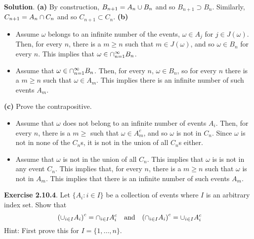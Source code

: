 \textbf{Solution}.
\textbf{(a)} By construction, \(B_{n+1} = A_{n} \cup B_{n}\) and so
\(B_{n + 1} \supset B_{n}\). Similarly, \(C_{n+1} = A_{n} \cap C_{n}\) and so
\(C_{n + 1} \subset C_{n}\).
\textbf{(b)}
\begin{itemize}
\item
  Assume \(\omega\) belongs to an infinite number of the events,
  \(\omega \in A_{j}\) for \(j \in J(\omega)\). Then, for every \(n\),
  there is a \(m \geq n\) such that \(m \in J(\omega)\), and so
  \(\omega \in B_{n}\) for every \(n\). This implies that
  \(\omega \in \cap_{n = 1}^{\infty} B_{n}\).
\item
  Assume that \(\omega \in \cap_{n = 1}^{\infty} B_{n}\). Then, for every
  \(n\), \(\omega \in B_{n}\), so for every \(n\) there is a \(m \geq n\)
  such that \(\omega \in A_m\). This implies there is an infinite number
  of such events \(A_m\).
\end{itemize}
\textbf{(c)}
Prove the contrapositive.
\begin{itemize}[tightlist]
\item
  Assume that \(\omega\) does not belong to an infinite number of events
  \(A_{i}\). Then, for every \(n\), there is a \(m \geq\) such that
  \(\omega \in A_m^{c}\), and so \(\omega\) is not in \(C_{n}\). Since
  \(\omega\) is not in none of the \(C_{n}\)s, it is not in the union of
  all \(C_{n}\)s either.
\item
  Assume that \(\omega\) is not in the union of all \(C_{n}\). This
  implies that \(\omega\) is is not in any event \(C_{n}\). This implies
  that, for every \(n\), there is a \(m \geq n\) such that \(\omega\) is
  not in \(A_m\). This implies that there is an infinite number of such
  events \(A_m\).
\end{itemize}

\textbf{Exercise 2.10.4}. Let \(\{ A_{i} : i \in I \}\) be a collection of
events where \(I\) is an arbitrary index set. Show that
\[
\
\left( \union_{i \in I} A_{i} \right)^{c} = \inter_{i \in I} A_{i}^{c} 
\quad \text{and} \quad
\left( \inter_{i \in I} A_{i} \right)^{c} = \union_{i \in I} A_{i}^{c} 
\]
Hint: First prove this for \(I = \{1, \dots, n\}\).

